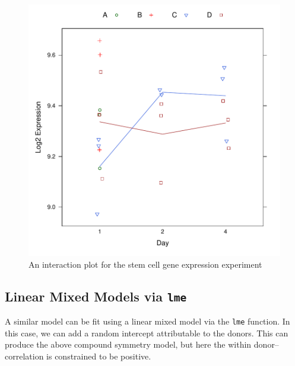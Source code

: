 \documentclass[12pt]{article}
\begin{document}
\begin{figure}[p]
   \begin{center}		
\includegraphics{contrast-example2Plot}
      \caption{An interaction plot for the stem cell gene expression experiment}
      \label{f:exp2}         
   \end{center}
\end{figure}
      


\subsection{Linear Mixed Models via \texttt{lme}}

A similar model can be fit using a linear mixed model via the \texttt{lme} function. In this case, we can add a random intercept attributable to the donors. This can produce the above compound symmetry model, but here the within donor--correlation is constrained to be positive.
\end{document}
